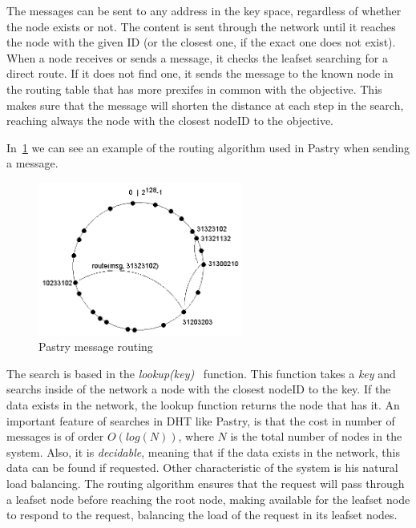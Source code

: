 The messages can be sent to any address in the key space, regardless of whether
the node exists or not. The content is sent through the network until it reaches the node with the given ID (or the closest one, if the exact one does not exist). When a node receives or sends a message, it checks the leafset searching for a direct route. If it does not find one, it sends the message to the known node in the routing table that has  more prexifes in common with the objective. This makes sure that the message will shorten the distance at each step in the search, reaching always the node with the closest nodeID to the objective.

In~\ref{fig:p2p_pastry_routing} we can see an example of the routing algorithm used in Pastry when sending a message.

\begin{figure}
\center
\includegraphics[width=0.6\textwidth]{img/pastryrouting}
\caption{Pastry message routing}
\label{fig:p2p_pastry_routing}
\end{figure}


The search is based in the \textit{lookup(key)}~\cite{BalakrishnanEtAl03} function.
This function takes a \textit{key} and searchs inside of the network a node with
the closest nodeID to the key. If the data exists in the network, the lookup
function returns the node that has it. An important feature of searches in DHT
like Pastry, is that the cost in number of messages is of order $O(log(N))$,
where $N$ is the total number of nodes in the system. Also, it is
\textit{decidable}, meaning that if the data exists in the network, this data
can be found if requested. Other characteristic of the system is his natural
load balancing. The routing algorithm ensures that the request will pass through
a leafset node before reaching the root node, making available for the leafset
node to respond to the request, balancing the load of the request in its
leafset nodes.


